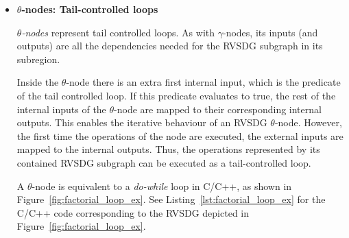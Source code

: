\begin{itemize}
\item \textbf{$\theta$-nodes: Tail-controlled loops}

\textit{$\theta$-nodes} represent tail controlled loops. As with
$\gamma$-nodes, its inputs (and outputs) are all the dependencies needed for the
RVSDG subgraph in its subregion.

Inside the $\theta$-node there is an extra first internal input, which is the
predicate of the tail controlled loop. If this predicate evaluates to true, the
rest of the internal inputs of the $\theta$-node are mapped to their
corresponding internal outputs. This enables the iterative behaviour of an RVSDG
$\theta$-node. However, the first time the operations of the node are executed,
the external inputs are mapped to the internal outputs. Thus, the operations
represented by its contained RVSDG subgraph can be executed as a tail-controlled
loop.

A $\theta$-node is equivalent to a \textit{do-while} loop in C/C++, as shown in
Figure~\ref{fig:factorial_loop_ex}. See Listing~\ref{lst:factorial_loop_ex} for
the C/C++ code corresponding to the RVSDG depicted in
Figure~\ref{fig:factorial_loop_ex}.


\end{itemize}
